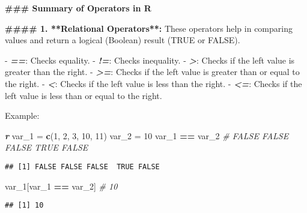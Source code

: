 \documentclass[
]{article}
\author{}
\date{\vspace{-2.5em}}
\newenvironment{Shaded}{\begin{snugshade}}{\end{snugshade}}
\newcommand{\CommentTok}[1]{\textcolor[rgb]{0.56,0.35,0.01}{\textit{#1}}}
\newcommand{\DecValTok}[1]{\textcolor[rgb]{0.00,0.00,0.81}{#1}}
\newcommand{\FunctionTok}[1]{\textcolor[rgb]{0.13,0.29,0.53}{\textbf{#1}}}
\newcommand{\InformationTok}[1]{\textcolor[rgb]{0.56,0.35,0.01}{\textbf{\textit{#1}}}}
\newcommand{\NormalTok}[1]{#1}
\newcommand{\OtherTok}[1]{\textcolor[rgb]{0.56,0.35,0.01}{#1}}
\newcommand{\SpecialCharTok}[1]{\textcolor[rgb]{0.81,0.36,0.00}{\textbf{#1}}}
\newcommand{\SpecialStringTok}[1]{\textcolor[rgb]{0.31,0.60,0.02}{#1}}
\begin{document}
\begin{Shaded}
\begin{Highlighting}[]

\FunctionTok{\#\#\# Summary of Operators in R}

\FunctionTok{\#\#\#\# 1. **Relational Operators**:}
\NormalTok{These operators help in comparing values and return a logical (Boolean) result (TRUE or FALSE).}

\SpecialStringTok{{-} }\InformationTok{\textasciigrave{}==\textasciigrave{}}\NormalTok{: Checks equality.}
\SpecialStringTok{{-} }\InformationTok{\textasciigrave{}!=\textasciigrave{}}\NormalTok{: Checks inequality.}
\SpecialStringTok{{-} }\InformationTok{\textasciigrave{}\textgreater{}\textasciigrave{}}\NormalTok{: Checks if the left value is greater than the right.}
\SpecialStringTok{{-} }\InformationTok{\textasciigrave{}\textgreater{}=\textasciigrave{}}\NormalTok{: Checks if the left value is greater than or equal to the right.}
\SpecialStringTok{{-} }\InformationTok{\textasciigrave{}\textless{}\textasciigrave{}}\NormalTok{: Checks if the left value is less than the right.}
\SpecialStringTok{{-} }\InformationTok{\textasciigrave{}\textless{}=\textasciigrave{}}\NormalTok{: Checks if the left value is less than or equal to the right.}

\NormalTok{Example:}

\InformationTok{\textasciigrave{}\textasciigrave{}\textasciigrave{} r}
\NormalTok{var\_1 }\OtherTok{=} \FunctionTok{c}\NormalTok{(}\DecValTok{1}\NormalTok{, }\DecValTok{2}\NormalTok{, }\DecValTok{3}\NormalTok{, }\DecValTok{10}\NormalTok{, }\DecValTok{11}\NormalTok{)}
\NormalTok{var\_2 }\OtherTok{=} \DecValTok{10}
\NormalTok{var\_1 }\SpecialCharTok{==}\NormalTok{ var\_2   }\CommentTok{\# FALSE FALSE FALSE TRUE FALSE}
\end{Highlighting}
\end{Shaded}

\begin{verbatim}
## [1] FALSE FALSE FALSE  TRUE FALSE
\end{verbatim}

\begin{Shaded}
\begin{Highlighting}[]
\NormalTok{var\_1[var\_1 }\SpecialCharTok{==}\NormalTok{ var\_2]  }\CommentTok{\# 10}
\end{Highlighting}
\end{Shaded}

\begin{verbatim}
## [1] 10
\end{verbatim}
\end{document}
